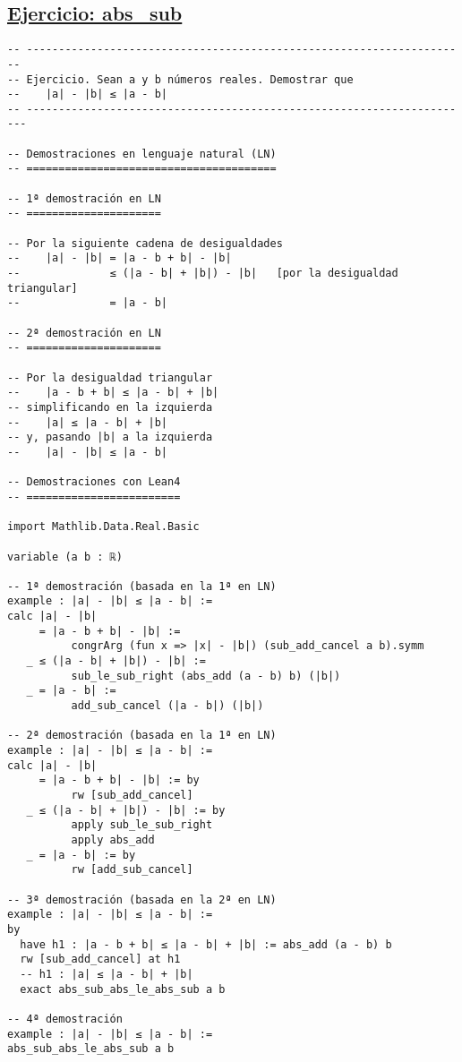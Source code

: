 \subsection{\href{./src/Basicos/abs\_sub.lean}{Ejercicio: abs\_sub}}
\label{sec:org2870229}
\begin{verbatim}
-- ---------------------------------------------------------------------
-- Ejercicio. Sean a y b números reales. Demostrar que
--    |a| - |b| ≤ |a - b|
-- ----------------------------------------------------------------------

-- Demostraciones en lenguaje natural (LN)
-- =======================================

-- 1ª demostración en LN
-- =====================

-- Por la siguiente cadena de desigualdades
--    |a| - |b| = |a - b + b| - |b|
--              ≤ (|a - b| + |b|) - |b|   [por la desigualdad triangular]
--              = |a - b|

-- 2ª demostración en LN
-- =====================

-- Por la desigualdad triangular
--    |a - b + b| ≤ |a - b| + |b|
-- simplificando en la izquierda
--    |a| ≤ |a - b| + |b|
-- y, pasando |b| a la izquierda
--    |a| - |b| ≤ |a - b|

-- Demostraciones con Lean4
-- ========================

import Mathlib.Data.Real.Basic

variable (a b : ℝ)

-- 1ª demostración (basada en la 1ª en LN)
example : |a| - |b| ≤ |a - b| :=
calc |a| - |b|
     = |a - b + b| - |b| :=
          congrArg (fun x => |x| - |b|) (sub_add_cancel a b).symm
   _ ≤ (|a - b| + |b|) - |b| :=
          sub_le_sub_right (abs_add (a - b) b) (|b|)
   _ = |a - b| :=
          add_sub_cancel (|a - b|) (|b|)

-- 2ª demostración (basada en la 1ª en LN)
example : |a| - |b| ≤ |a - b| :=
calc |a| - |b|
     = |a - b + b| - |b| := by
          rw [sub_add_cancel]
   _ ≤ (|a - b| + |b|) - |b| := by
          apply sub_le_sub_right
          apply abs_add
   _ = |a - b| := by
          rw [add_sub_cancel]

-- 3ª demostración (basada en la 2ª en LN)
example : |a| - |b| ≤ |a - b| :=
by
  have h1 : |a - b + b| ≤ |a - b| + |b| := abs_add (a - b) b
  rw [sub_add_cancel] at h1
  -- h1 : |a| ≤ |a - b| + |b|
  exact abs_sub_abs_le_abs_sub a b

-- 4ª demostración
example : |a| - |b| ≤ |a - b| :=
abs_sub_abs_le_abs_sub a b
\end{verbatim}

